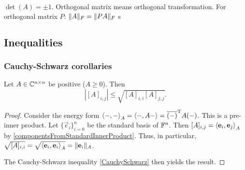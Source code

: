 $\det(A) = \pm 1$. Orthogonal matrix means orthogonal transformation.
For orthogonal matrix $P$: $\lVert A\rVert_F = \lVert PA\rVert_F$
s

\subsection{Inequalities}
\subsubsection{Cauchy-Schwarz corollaries}
\begin{lemma}
Let $A\in \mathbb{C}^{n\times n}$ be positive ($A\geq 0$). Then
\[ |[A]_{i,j}| \leq \sqrt{[A]_{i,i}[A]_{j,j}}. \]
\end{lemma}
\begin{proof}
Consider the energy form $\inner{-, -}_A = \inner{-, A-} = \overline{(-)}^\transp A(-)$. This is a pre-inner product. Let $\{\vec{e}_i\}_{i=0}^n$ be the standard basis of $\mathbb{F}^n$. Then $[A]_{i,j} = \inner{\vec{e}_i, \vec{e}_j}_A$ by \ref{componentsFromStandardInnerProduct}. Thus, in particular, $\sqrt{[A]_{i,i}} = \sqrt{\inner{\vec{e}_i, \vec{e}_i}_A} = \norm{\vec{e}_i}_A$.

The Cauchy-Schwarz inequality \ref{CauchySchwarz} then yields the result.
\end{proof}

